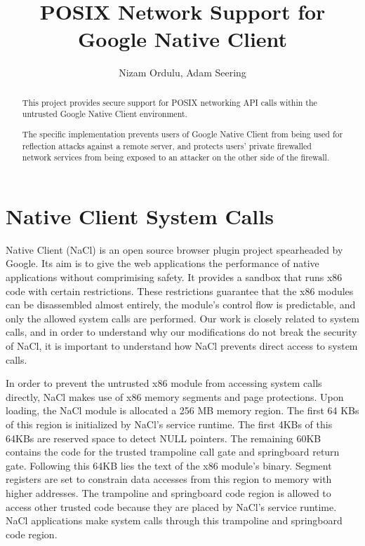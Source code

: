 \documentclass[a4paper,10pt]{article}
\title{POSIX Network Support for Google Native Client}
\author{Nizam Ordulu, Adam Seering}
\begin{document}
\maketitle

\begin{abstract}
This project provides secure support for POSIX networking API calls within the
untrusted Google Native Client environment.

The specific implementation prevents users of Google Native Client from being
used for reflection attacks against a remote server, and protects users'
private firewalled network services from being exposed to an attacker on the
other side of the firewall.
\end{abstract}

\section{Native Client System Calls}


Native Client (NaCl) is an open source browser plugin project spearheaded by
Google. Its aim is to give the web applications the performance of native
applications without comprimising safety. It provides a sandbox that runs x86
code with certain restrictions. These restrictions guarantee that the x86
modules can be disassembled almost entirely, the module's control flow is
predictable, and only the allowed system calls are performed. Our work is
closely related to system calls, and in order to understand why our
modifications do not break the security of NaCl, it is important to understand
how NaCl prevents direct access to system calls.

In order to prevent the untrusted x86 module from accessing system calls
directly, NaCl makes use of x86 memory segments and page protections. Upon
loading, the NaCl module is allocated a 256 MB memory region. The first 64 KBs
of this region is initialized by NaCl's service runtime. The first 4KBs of this
64KBs are reserved space to detect NULL pointers. The remaining 60KB contains
the code for the trusted trampoline call gate and springboard return gate.
Following this 64KB lies the text of the x86 module's binary. Segment registers are set to
constrain data accesses from this region to memory with higher addresses. The
trampoline and springboard code region is allowed to access other trusted code
because they are placed by NaCl's service runtime. NaCl applications make
system calls through this trampoline and springboard code region.
\end{document}
